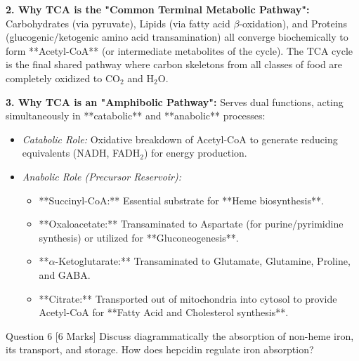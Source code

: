 \documentclass[11pt,a4paper]{article}
\begin{document}
\begin{ansbox}
\textbf{2. Why TCA is the "Common Terminal Metabolic Pathway":}
Carbohydrates (via pyruvate), Lipids (via fatty acid $\beta$-oxidation), and Proteins (glucogenic/ketogenic amino acid transamination) all converge biochemically to form **Acetyl-CoA** (or intermediate metabolites of the cycle). The TCA cycle is the final shared pathway where carbon skeletons from all classes of food are completely oxidized to $\text{CO}_2$ and $\text{H}_2\text{O}$.

\textbf{3. Why TCA is an "Amphibolic Pathway":}
Serves dual functions, acting simultaneously in **catabolic** and **anabolic** processes:
\begin{itemize}[leftmargin=*]
    \item \textit{Catabolic Role:} Oxidative breakdown of Acetyl-CoA to generate reducing equivalents (NADH, FADH$_2$) for energy production.
    \item \textit{Anabolic Role (Precursor Reservoir):}
    \begin{itemize}
        \item **Succinyl-CoA:** Essential substrate for **Heme biosynthesis**.
        \item **Oxaloacetate:** Transaminated to Aspartate (for purine/pyrimidine synthesis) or utilized for **Gluconeogenesis**.
        \item **$\alpha$-Ketoglutarate:** Transaminated to Glutamate, Glutamine, Proline, and GABA.
        \item **Citrate:** Transported out of mitochondria into cytosol to provide Acetyl-CoA for **Fatty Acid and Cholesterol synthesis**.
    \end{itemize}
\end{itemize}
\end{ansbox}

\begin{qbox}{Question 6 [6 Marks]}
Discuss diagrammatically the absorption of non-heme iron, its transport, and storage. How does hepcidin regulate iron absorption?
\end{qbox}
\end{document}

